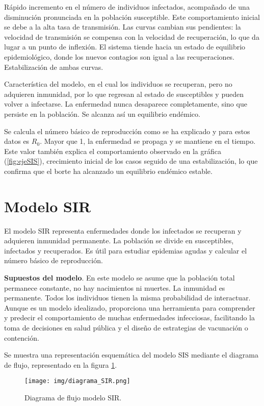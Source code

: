 Rápido incremento en el número de individuos infectados, acompañado de una disminución pronunciada en la población susceptible. Este comportamiento inicial se debe a la alta tasa de transmisión.
Las curvas cambian sus pendientes: la velocidad de transmisión se compensa con la velocidad de recuperación, lo que da lugar a un punto de inflexión. El sistema tiende hacia un estado de equilibrio epidemiológico, donde los nuevos contagios son igual a las recuperaciones. Estabilización de ambas curvas.

Característica del modelo, en el cual los individuos se recuperan, pero no adquieren inmunidad, por lo que regresan al estado de susceptibles y pueden volver a infectarse. La enfermedad nunca desaparece completamente, sino que persiste en la población. Se alcanza así un equilibrio endémico.

Se calcula el número básico de reproducción como se ha explicado y para estos datos es $R_0$. Mayor que 1, la enfermedad se propaga y se mantiene en el tiempo. Este valor también explica el comportamiento observado en la gráfica (\ref{fig:ejeSIS}), crecimiento inicial de los casos seguido de una estabilización, lo que confirma que el borte ha alcanzado un equilibrio endémico estable.






\section{Modelo SIR}
El modelo SIR representa enfermedades donde los infectados se recuperan y adquieren inmunidad permanente. La población se divide en susceptibles, infectados y recuperados. Es útil para estudiar epidemias agudas y calcular el número básico de reproducción.

\textbf{Supuestos del modelo}. En este modelo se asume que la población total permanece constante, no hay nacimientos ni muertes. La inmunidad es permanente. Todos los individuos tienen la misma probabilidad de interactuar.
Aunque es un modelo idealizado, proporciona una herramienta para comprender y predecir el comportamiento de muchas enfermedades infecciosas, facilitando la toma de decisiones en salud pública y el diseño de estrategias de vacunación o contención.

Se muestra una representación esquemática del modelo SIS mediante el diagrama de flujo, representado en la figura \ref{fig:diagrama SIR}.
\begin{figure}[H]
    \centering
    \texttt{[image: img/diagrama\_SIR.png]}
    \caption{Diagrama de flujo modelo SIR.}
    \label{fig:diagrama SIR}
   
\end{figure}

